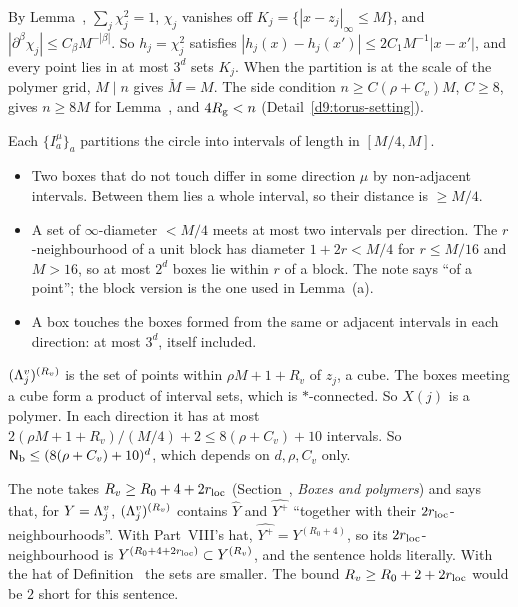 \begin{detail}\label{d9:fam-setting}
\begin{step}
By Lemma~, $\sum_j\chi_j^2=1$, $\chi_j$ vanishes off $K_j=\{|x-z_j|_\infty\le M\}$, and $|\partial^\beta\chi_j|\le C_\beta M^{-|\beta|}$. So $h_j=\chi_j^2$ satisfies $|h_j(x)-h_j(x')|\le2C_1M^{-1}|x-x'|$, and every point lies in at most $3^d$ sets $K_j$. When the partition is at the scale of the polymer grid, $M\mid n$ gives $\check M=M$. The side condition $n\ge C(\rho+C_v)M$, $C\ge8$, gives $n\ge8M$ for Lemma~, and $4R_{\rm g}<n$ (Detail~\ref{d9:torus-setting}).
\end{step}
\begin{step}[Boxes]
Each $\{I^\mu_a\}_a$ partitions the circle into intervals of length in $[M/4,M]$.
\begin{itemize}
\item Two boxes that do not touch differ in some direction $\mu$ by non-adjacent intervals. Between them lies a whole interval, so their distance is $\ge M/4$.
\item A set of $\infty$-diameter $<M/4$ meets at most two intervals per direction. The $r$-neighbourhood of a unit block has diameter $1+2r<M/4$ for $r\le M/16$ and $M>16$, so at most $2^d$ boxes lie within $r$ of a block. The note says ``of a point''; the block version is the one used in Lemma~(a).
\item A box touches the boxes formed from the same or adjacent intervals in each direction: at most $3^d$, itself included.
\end{itemize}
\end{step}
\begin{step}[$X(j)$]
$(\Lambda^v_j)^{(R_v)}$ is the set of points within $\rho M+1+R_v$ of $z_j$, a cube. The boxes meeting a cube form a product of interval sets, which is $*$-connected. So $X(j)$ is a polymer. In each direction it has at most $2(\rho M+1+R_v)/(M/4)+2\le8(\rho+C_v)+10$ intervals. So $\mathsf N_{\rm b}\le(8(\rho+C_v)+10)^d$, which depends on $d,\rho,C_v$ only.
\end{step}
\begin{step}
The note takes $R_v\ge R_0+4+2r_{\rm loc}$ (Section~, \emph{Boxes and polymers}) and says that, for $Y=\Lambda^v_j$, $(\Lambda^v_j)^{(R_v)}$ contains $\hat Y$ and $\widehat{Y^+}$ ``together with their $2r_{\rm loc}$-neighbourhoods''. With Part~VIII's hat, $\widehat{Y^+}=Y^{(R_0+4)}$, so its $2r_{\rm loc}$-neighbourhood is $Y^{(R_0+4+2r_{\rm loc})}\subset Y^{(R_v)}$, and the sentence holds literally. With the hat of Definition~ the sets are smaller. The bound $R_v\ge R_0+2+2r_{\rm loc}$ would be $2$ short for this sentence.


\end{step}
\end{detail}
